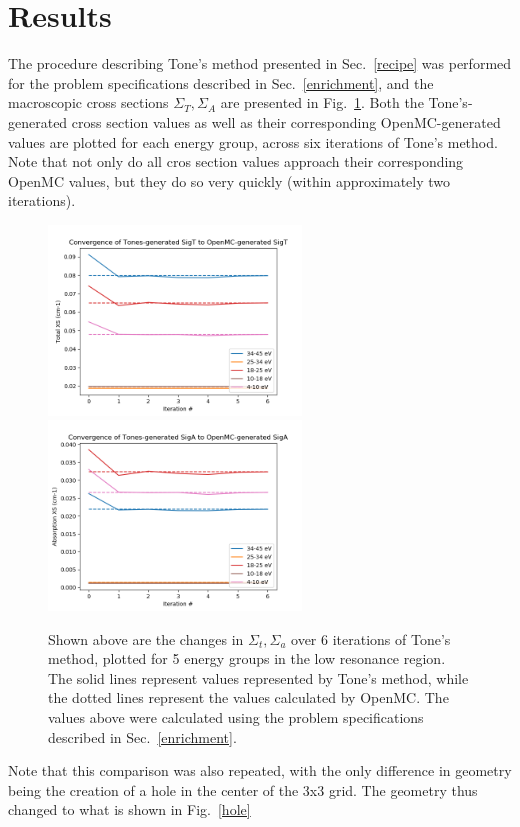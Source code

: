 \documentclass[10pt]{article}
\begin{document}
  \section{Results}
  The procedure describing Tone's method presented in Sec.~\ref{recipe} was performed for the problem specifications described in Sec.~\ref{enrichment}, and the macroscopic cross sections $\Sigma_T,\Sigma_A$ are presented in Fig.~\ref{fig:results1}. Both the Tone's-generated cross section values as well as their corresponding OpenMC-generated values are plotted for each energy group, across six iterations of Tone's method. Note that not only do all cros section values approach their corresponding OpenMC values, but they do so very quickly (within approximately two iterations).
  \begin{figure}[H]
    \begin{center}
    \includegraphics[width=0.6\textwidth]{convergence_of_tones_sigT}
    \includegraphics[width=0.6\textwidth]{convergence_of_tones_sigA}
      \caption{Shown above are the changes in $\Sigma_t,\Sigma_a$ over 6 iterations of Tone's method, plotted for 5 energy groups in the low resonance region. The solid lines represent values represented by Tone's method, while the dotted lines represent the values calculated by OpenMC. The values above were calculated using the problem specifications described in Sec.~\ref{enrichment}.}
      \label{fig:results1}
    \end{center}
  \end{figure}
  Note that this comparison was also repeated, with the only difference in geometry being the creation of a hole in the center of the 3x3 grid. The geometry thus changed to what is shown in Fig.~\ref{hole}
\end{document}
